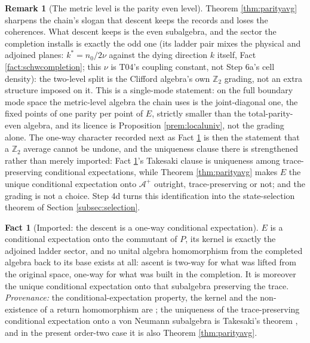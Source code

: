 \documentclass[11pt]{article}
\theoremstyle{definition}
\newtheorem{remark}[theorem]{Remark}
\newtheorem{fact}[theorem]{Fact}
\newcommand{\nO}{n_0}
\newcommand{\Aev}{\mathcal{A}^{+}}
\begin{document}
\begin{remark}[The metric level is the parity even level]\label{rem:evenledger}
Theorem \ref{thm:parityavg} sharpens the chain's slogan that descent keeps the records and loses the coherences. What descent keeps is the even subalgebra, and the sector the completion installs is exactly the odd one (its ladder pair mixes the physical and adjoined planes: $k^{*} = \nO/2\nu$ against the dying direction $k$ itself, Fact \ref{fact:schwcompletion}; this $\nu$ is T04's coupling constant, not Step 6a's cell density): the two-level split is the Clifford algebra's own $\mathbb{Z}_2$ grading, not an extra structure imposed on it. This is a single-mode statement: on the full boundary mode space the metric-level algebra the chain uses is the joint-diagonal one, the fixed points of one parity per point of $E$, strictly smaller than the total-parity-even algebra, and its licence is Proposition \ref{prem:localuniv}, not the grading alone. The one-way character recorded next as Fact \ref{fact:oneway} is then the statement that a $\mathbb{Z}_2$ average cannot be undone, and the uniqueness clause there is strengthened rather than merely imported: Fact \ref{fact:oneway}'s Takesaki clause is uniqueness among trace-preserving conditional expectations, while Theorem \ref{thm:parityavg} makes $E$ the unique conditional expectation onto $\Aev$ outright, trace-preserving or not; and the grading is not a choice. Step 4d turns this identification into the state-selection theorem of Section \ref{subsec:selection}.
\end{remark}

\begin{fact}[Imported: the descent is a one-way conditional expectation]\label{fact:oneway}
$E$ is a conditional expectation onto the commutant of $P$, its kernel is exactly the adjoined ladder sector, and no unital algebra homomorphism from the completed algebra back to its base exists at all: ascent is two-way for what was lifted from the original space, one-way for what was built in the completion. It is moreover the unique conditional expectation onto that subalgebra preserving the trace. \emph{Provenance:} the conditional-expectation property, the kernel and the non-existence of a return homomorphism are \cite[Prop.~7.5, Thm.~7.6]{ButlerT1}; the uniqueness of the trace-preserving conditional expectation onto a von Neumann subalgebra is Takesaki's theorem \cite{Takesaki1972}, and in the present order-two case it is also Theorem \ref{thm:parityavg}.
\end{fact}
\end{document}
